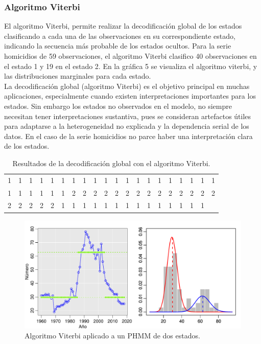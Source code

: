 \documentclass[a4paper]{article}\usepackage[]{graphicx}\usepackage[]{color}
\makeatletter
\def\maxwidth{ %
  \ifdim\Gin@nat@width>\linewidth
    \linewidth
  \else
    \Gin@nat@width
  \fi
}
\newenvironment{knitrout}{}{} %
\makeatother
\begin{document}
\subsubsection*{Algoritmo Viterbi}

El algoritmo Viterbi, permite realizar la decodificación global de los estados clasificando a cada una de las observaciones en su correspondiente estado, indicando la secuencia más probable de los estados ocultos. Para la serie homicidios de 59 observaciones, el algoritmo Viterbi clasifico 40 observaciones en el estado 1 y 19 en el estado 2. En la gráfica 5 se visualiza el algoritmo viterbi, y las distribuciones marginales para cada estado.
\\
La decodificación global (algoritmo Viterbi) es el objetivo principal en muchas aplicaciones, especialmente cuando existen interpretaciones importantes para los estados. Sin embargo los estados no observados en el modelo, no siempre necesitan tener interpretaciones sustantiva, pues se consideran artefactos útiles para adaptarse a la heterogeneidad no explicada y la dependencia serial de los datos. En el caso de la serie homicidios no parce haber una interpretación clara de los estados.

\begin{table}[ht]
\centering
\begin{tabular}{rrrrrrrrrrrrrrrrrrrr}
  \hline
  \hline
1 & 1 & 1 & 1 & 1 & 1 & 1 & 1 & 1 & 1 & 1 & 1 & 1 & 1 & 1 & 1 & 1 & 1 & 1 & 1 \\ 
  1 & 1 & 1 & 1 & 1 & 1 & 2 & 2 & 2 & 2 & 2 & 2 & 2 & 2 & 2 & 2 & 2 & 2 & 2 & 2 \\ 
  2 & 2 & 2 & 2 & 2 & 1 & 1 & 1 & 1 & 1 & 1 & 1 & 1 & 1 & 1 & 1 & 1 & 1 & 1 &  \\ 
   \hline
\end{tabular}
\caption{Resultados de la decodificación global con el algoritmo Viterbi.} 
\end{table}


\begin{knitrout}
\color{fgcolor}\begin{figure}
\includegraphics[width=\maxwidth]{figure/unnamed-chunk-18-1} \caption[Algoritmo Viterbi aplicado a un PHMM de dos estados]{Algoritmo Viterbi aplicado a un PHMM de dos estados.}\label{fig:unnamed-chunk-18}
\end{figure}


\end{knitrout}
\end{document}
